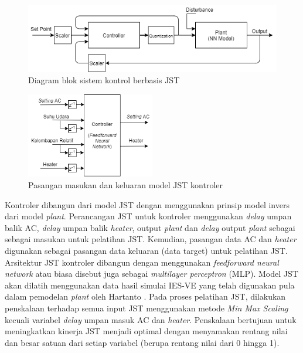 \begin{figure}[!h]
	\centering
	\includegraphics[width=1\textwidth]{figures/ControlDesignDiagramII}
	\caption{Diagram blok sistem kontrol berbasis JST \cite{paper42Paisan}}
	\label{fig:4:ConstrolSystemBlockDiagram}
\end{figure}

\begin{figure}[!h]
	\centering
	\includegraphics[width=0.5\textwidth]{figures/NNControllerIO}
	\caption{Pasangan masukan dan keluaran model JST kontroler}
	\label{fig:4:NNControlIO}
\end{figure}

Kontroler dibangun dari model JST dengan menggunakan prinsip model invers dari model \textit{plant}. Perancangan JST untuk kontroler menggunakan \textit{delay} umpan balik AC, \textit{delay} umpan balik \textit{heater}, output \textit{plant} dan \textit{delay} output \textit{plant} sebagai sebagai masukan untuk pelatihan JST. Kemudian, pasangan data AC dan \textit{heater} digunakan sebagai pasangan data keluaran (data target) untuk pelatihan JST. Arsitektur JST kontroler dibangun dengan menggunakan \textit{feedforward neural network} atau biasa disebut juga sebagai \textit{multilayer perceptron} (MLP). Model JST akan dilatih menggunakan data hasil simulai IES-VE yang telah digunakan pula dalam pemodelan \textit{plant} oleh Hartanto \cite{skripsiTanto}. Pada proses pelatihan JST, dilakukan penskalaan terhadap semua input JST menggunakan metode \textit{Min Max Scaling} kecuali variabel \textit{delay} umpan masuk AC dan \textit{heater}. Penskalaan bertujuan untuk meningkatkan kinerja JST menjadi optimal dengan menyamakan rentang nilai dan besar satuan dari setiap variabel (berupa rentang nilai dari 0 hingga 1).

